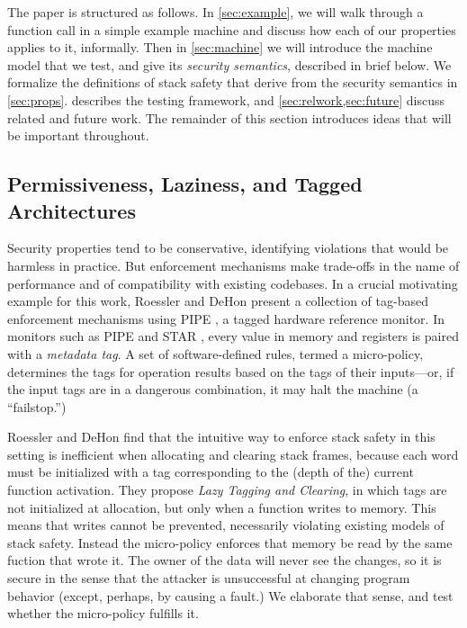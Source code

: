 The paper is structured as follows. In \cref{sec:example}, we will walk through a function
call in a simple example machine and discuss how each of our properties applies to it,
informally. Then in \cref{sec:machine} we will introduce the machine model that we test, and give
its {\em security semantics}, described in brief below. We formalize the definitions of
stack safety that derive from the security semantics in \cref{sec:props}.
 describes the testing framework, and
\cref{sec:relwork,sec:future} discuss related and future work.
The remainder of this section introduces ideas that will be important throughout.
%

\subsection{Permissiveness, Laziness, and Tagged Architectures}

Security properties tend to be conservative, identifying violations that would be
harmless in practice. But enforcement mechanisms make trade-offs in the name of performance
and of compatibility with existing codebases. In a crucial motivating example for this work,
Roessler and DeHon \cite{} present a collection of tag-based enforcement mechanisms
using PIPE \cite{???}, a tagged hardware reference monitor. In monitors such as PIPE and
STAR \cite{???}, every value in memory and registers is paired with a {\em metadata tag}.
A set of software-defined rules, termed a micro-policy, determines the tags for operation
results based on the tags of their inputs---or, if the input tags are in a dangerous
combination, it may halt the machine (a ``failstop.'')

Roessler and DeHon find that the intuitive way to enforce stack safety in this setting
is inefficient when allocating and clearing stack frames, because each word must be initialized
with a tag corresponding to the (depth of the) current function activation. They propose
{\em Lazy Tagging and Clearing}, in which tags are not initialized at allocation, but only
when a function writes to memory. This means that writes cannot be prevented, necessarily
violating existing models of stack safety. Instead the micro-policy enforces that memory be
read by the same fuction that wrote it. The owner of the data will never see the changes,
so it is secure in the sense that the attacker is unsuccessful at changing program behavior
(except, perhaps, by causing a fault.) We elaborate that sense, and test whether the
micro-policy fulfills it.

